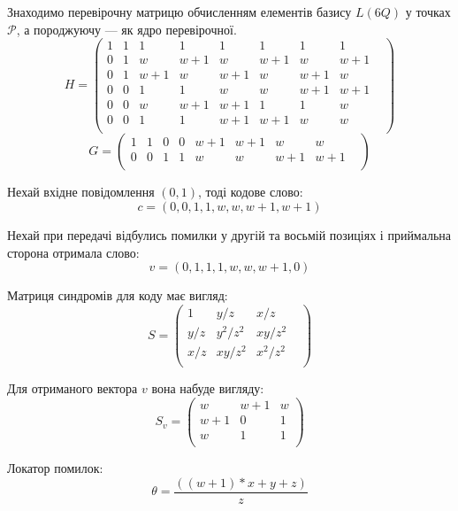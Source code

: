 \documentclass[a4paper,14pt,oneside]{extarticle}
\begin{document}
Знаходимо перевірочну матрицю обчисленням елементів базису $L(6Q)$ у точках $\mathcal{P}$, а породжуючу --- як ядро перевірочної.
$$
H = 
\begin{pmatrix}
    1 & 1 & 1 & 1 & 1 & 1 & 1 & 1 & \\
    0 & 1 & w & w + 1 & w & w + 1 & w & w + 1 & \\
    0 & 1 & w + 1 & w & w + 1 & w & w + 1 & w & \\
    0 & 0 & 1 & 1 & w & w & w + 1 & w + 1 & \\
    0 & 0 & w & w + 1 & w + 1 & 1 & 1 & w & \\
    0 & 0 & 1 & 1 & w + 1 & w + 1 & w & w & \\
\end{pmatrix}
$$
$$
G = 
\begin{pmatrix}
    1 & 1 & 0 & 0 & w + 1 & w + 1 & w & w & \\
    0 & 0 & 1 & 1 & w & w & w + 1 & w + 1 & \\
\end{pmatrix}
$$

Нехай вхідне повідомлення $(0,1)$, тоді кодове слово:
$$c=(0, 0, 1, 1, w, w, w + 1, w + 1)$$

Нехай при передачі відбулись помилки у другій та восьмій позиціях і приймальна сторона отримала слово:
$$v=(0, 1, 1, 1, w, w, w + 1, 0)$$

Матриця синдромів для коду має вигляд:
$$
S =
\begin{pmatrix}
    1 &  y/z &  x/z &  \\
    y/z &  y^2/z^2 &  xy/z^2 &  \\
    x/z &  xy/z^2 &  x^2/z^2 &  \\
\end{pmatrix}
$$

Для отриманого вектора $v$ вона набуде вигляду:
$$
S_v =
\begin{pmatrix}
    w & w +1 & w \\
    w + 1 & 0 & 1 \\
    w & 1 & 1 \\
\end{pmatrix}
$$

Локатор помилок:
$$
\theta = \frac{(( w + 1)*x + y + z)}{z}
$$
\end{document}

